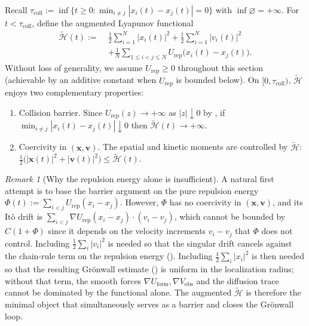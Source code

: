 \documentclass[pdflatex,sn-mathphys-num]{sn-jnl}%
\numberwithin{equation}{section}
\theoremstyle{thmstyleone}%
\theoremstyle{remark}
\newtheorem{remark}{Remark}
\theoremstyle{definition}
\begin{document}
Recall
$\tau_{\mathrm{coll}} := \inf\{t\ge 0 : \min_{i\neq j}|x_i(t)-x_j(t)|=0\}$
with $\inf\varnothing = +\infty$. For $t<\tau_{\mathrm{coll}}$, define the augmented Lyapunov functional
\begin{equation}\label{eq:Htilde-body}
\begin{aligned}
  \widetilde{\mathscr H}(t)
  := \;&\frac{1}{2}\sum_{i=1}^{N}|x_i(t)|^2
       + \frac{1}{2}\sum_{i=1}^{N}|v_i(t)|^2 \\
       &+ \frac{1}{N}\sum_{1\le i<j\le N} U_{\mathrm{rep}}\bigl(x_i(t)-x_j(t)\bigr).
\end{aligned}
\end{equation}
Without loss of generality, we assume $U_{\mathrm{rep}}\ge 0$ throughout
this section (achievable by an additive constant when $U_{\mathrm{rep}}$ is
bounded below). On $[0,\tau_{\mathrm{coll}})$, $\widetilde{\mathscr H}$
enjoys two complementary properties:

\begin{enumerate}[label=(\roman*)]
\item Collision barrier. Since $U_{\mathrm{rep}}(z)\to+\infty$ as
$|z|\downarrow 0$ by , if
$\min_{i\neq j}|x_i(t)-x_j(t)|\downarrow 0$ then
$\widetilde{\mathscr H}(t)\to+\infty$.
\item Coercivity in $(\mathbf{x},\mathbf{v})$. The spatial and kinetic moments
are controlled by $\widetilde{\mathscr H}$:
$\tfrac{1}{2}\bigl(|\mathbf{x}(t)|^2+|\mathbf{v}(t)|^2\bigr) \le \widetilde{\mathscr H}(t)$.
\end{enumerate}

\begin{remark}[Why the repulsion energy alone is insufficient]
\label{rem:why-augmented}
A natural first attempt is to base the barrier argument on the pure
repulsion energy $\Phi(t) := \sum_{i<j}U_{\mathrm{rep}}(x_i-x_j)$. However,
$\Phi$ has no coercivity in $(\mathbf{x},\mathbf{v})$, and its It\^o drift is
$\sum_{i<j}\nabla U_{\mathrm{rep}}(x_i-x_j)\cdot(v_i-v_j)$, which cannot be
bounded by $C(1+\Phi)$ since it depends on the velocity increments
$v_i-v_j$ that $\Phi$ does not control. Including
$\tfrac12\sum_i|v_i|^2$ is needed so that the singular drift cancels
against the chain-rule term on the repulsion energy
(). Including $\tfrac12\sum_i|x_i|^2$ is then
needed so that the resulting Gr\"onwall estimate
() is uniform in the localization radius;
without that term, the smooth forces $\nabla U_{\mathrm{form}},
\nabla V_{\mathrm{obs}}$ and the diffusion trace cannot be dominated by the
functional alone. The augmented $\widetilde{\mathscr H}$ is therefore the
minimal object that simultaneously serves as a barrier and closes the
Gr\"onwall loop.
\end{remark}
\end{document}
